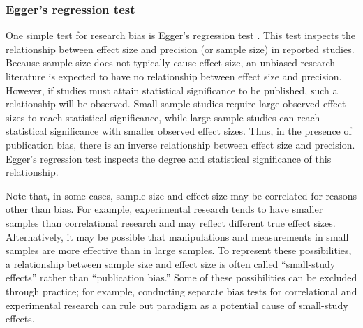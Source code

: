 \documentclass[man]{apa6}
\begin{document}

\subsubsection{Egger's regression test}
One simple test for research bias is Egger's regression test \citep{Egger:1997}. This test inspects the relationship between effect size and precision (or sample size) in reported studies. Because sample size does not typically cause effect size, an unbiased research literature is expected to have no relationship between effect size and precision. However, if studies must attain statistical significance to be published, such a relationship will be observed. Small-sample studies require large observed effect sizes to reach statistical significance, while large-sample studies can reach statistical significance with smaller observed effect sizes. Thus, in the presence of publication bias, there is an inverse relationship between effect size and precision. Egger's regression test inspects the degree and statistical significance of this relationship.

Note that, in some cases, sample size and effect size may be correlated for reasons other than bias. For example, experimental research tends to have smaller samples than correlational research and may reflect different true effect sizes. Alternatively, it may be possible that manipulations and measurements in small samples are more effective than in large samples. To represent these possibilities, a relationship between sample size and effect size is often called ``small-study effects'' rather than ``publication bias.'' Some of these possibilities can be excluded through practice; for example, conducting separate bias tests for correlational and experimental research can rule out paradigm as a potential cause of small-study effects.
\end{document}
